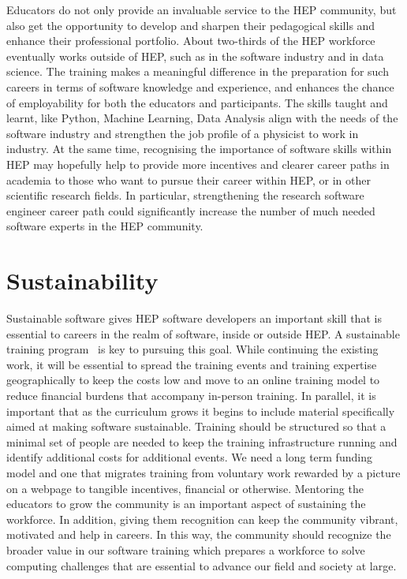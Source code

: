 \documentclass[twocolumn]{svjour3}          %
\begin{document}
Educators do not only provide an invaluable service to the HEP community, but also get the opportunity to develop and sharpen their pedagogical skills and enhance their professional portfolio. About two-thirds of the HEP workforce eventually works outside of HEP, such as in the software industry and in data science. The training makes a meaningful difference in the preparation for such careers in terms of software knowledge and experience, and enhances the chance of employability for both the educators and participants. The skills taught and learnt, like Python, Machine Learning, Data Analysis align with the needs of the software industry and strengthen the job profile of a physicist to work in industry. At the same time, recognising the importance of software skills within HEP may hopefully help to provide more incentives and clearer career paths in academia to those who want to pursue their career within HEP, or in other scientific research fields. In particular, strengthening the research software engineer career path could significantly increase the number of much needed software experts in the HEP community. 

\section{Sustainability}\label{sec:Sustainability}

Sustainable software \cite{dan_katz}  gives HEP software developers an important skill that is essential to careers in the realm of software, inside or outside HEP. A sustainable training program~\cite{sustainability_flashtalk} is key to pursuing this goal. While continuing the existing work, it will be essential to  spread the training events and training expertise geographically to keep the costs low and move to an online training model to reduce financial burdens that accompany in-person training. In parallel, it is important that as the curriculum grows it begins to include material specifically aimed at making software sustainable.  Training should be structured so that a minimal set of people are needed to keep the training infrastructure running and identify additional costs for additional events. We need a long term funding model and one that migrates training from voluntary work rewarded by a picture on a webpage to tangible incentives, financial or otherwise. Mentoring the educators to grow the community is an important aspect of sustaining the workforce. In addition, giving them recognition can keep the community vibrant, motivated and help in careers. In this way, the community should recognize the broader value in our software training which prepares a workforce to solve computing challenges that are essential to advance our field and society at large.
\end{document}
